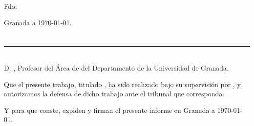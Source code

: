 \vspace{6cm}

\noindent Fdo: \emph{\estudiante}

\vspace{2cm}

\begin{flushright}
Granada a \today.
\end{flushright}


\chapter*{}
\thispagestyle{empty}

\noindent\rule[-1ex]{\textwidth}{2pt}\\[4.5ex]

D. \textbf{\tutorA}, Profesor del Área de {\areaA} del Departamento {\departamentoA} de la Universidad de Granada.

\vspace{0.5cm}


\vspace{0.5cm}


\vspace{0.5cm}

Que el presente trabajo, titulado \textit{\textbf{\tituloTFM}},
ha sido realizado bajo su supervisión por \textbf{\estudiante}, y autorizamos la defensa de dicho trabajo ante el tribunal
que corresponda.

\vspace{0.5cm}

Y para que conste, expiden y firman el presente informe en Granada a \today.

\vspace{1cm}


\vspace{5cm}



